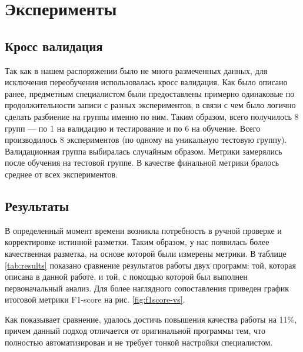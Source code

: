 \chapter{Эксперименты}

\section{Кросс валидация}
Так как в нашем распоряжении было не много размеченных данных, для исключения
переобучения использовалась кросс валидация. Как было описано ранее, предметным
специалистом были предоставлены примерно одинаковые по продолжительности записи
с разных экспериментов, в связи с чем было логично сделать разбиение на группы
именно по ним. Таким образом, всего получилось 8 групп --- по 1 на
валидацию и тестирование и по 6 на обучение. Всего производилось 8
экспериментов (по одному на уникальную тестовую группу). Валидационная группа
выбиралась случайным образом. Метрики замерялись после обучения на тестовой
группе. В качестве финальной метрики бралось среднее от всех экспериментов.

\section{Результаты}

В определенный момент времени возникла потребность в ручной проверке и
корректировке истинной разметки. Таким образом, у нас появилась более
качественная разметка, на основе которой были измерены метрики. В таблице
\ref{tab:results} показано сравнение результатов работы двух программ: той,
которая описана в данной работе, и той, с помощью которой был выполнен
первоначальный анализ. Для более наглядного сопоставления приведен график
итоговой метрики F1-score на рис. \ref{fig:f1score-vs}.

Как показывает сравнение, удалось достичь повышения качества работы на 11\%,
причем данный подход отличается от оригинальной программы тем, что полностью
автоматизирован и не требует тонкой настройки специалистом.

